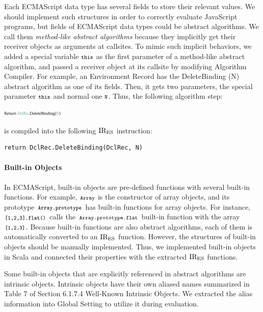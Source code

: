 Each ECMAScript data type has several fields to store their relevant values.
We should implement such structures in order to correctly evaluate JavaScript
programs, but fields of ECMAScript data types could be abstract algorithms.
We call them \textit{method-like abstract algorithms} because they
implicitly get their receiver objects as arguments at callsites.
To mimic such implicit behaviors, we added a special variable
\( \texttt{\footnotesize this} \) as the first parameter of a method-like abstract algorithm,
and passed a receiver object at its callsite by modifying
\textsf{Algorithm Compiler}.  For example, an Environment Record has
the \textsf{DeleteBinding (N)} abstract algorithm as one of its fields.
Then, it gets two parameters, the special parameter \( \texttt{\footnotesize this} \)
and normal one \( \texttt{\footnotesize N} \).  Thus, the following algorithm step:
\begin{center}
  \includegraphics[width=0.22\textwidth]{img/method-like-example.png}
\end{center}
is compiled into the following \( \text{IR}_\text{ES} \) instruction:
\begin{lstlisting}[style=ires]
return DclRec.DeleteBinding(DclRec, N)
\end{lstlisting}

\vspace*{-.5em}
\paragraph{Built-in Objects}
In ECMAScript, built-in objects are pre-defined functions with several
built-in functions.  For example, \( \texttt{\footnotesize Array} \)
is the constructor of array objects, and its prototype
\( \texttt{\footnotesize Array.prototype} \) has built-in functions for array objects.
For instance, \( \texttt{\footnotesize[1,2,3].flat()} \) calls the
\( \texttt{\footnotesize Array.prototype.flat} \) built-in function with the array
\( \texttt{\footnotesize[1,2,3]} \).  Because built-in functions are also abstract
algorithms, each of them is automatically converted to an \( \text{IR}_\text{ES} \)
function.  However, the structures of built-in objects should be
manually implemented.  Thus, we implemented built-in objects in Scala
and connected their properties with the extracted \( \text{IR}_\text{ES} \) functions.

Some built-in objects that are explicitly referenced in abstract
algorithms are intrinsic objects.  Intrinsic objects have their own
aliased names summarized in Table 7 of Section 6.1.7.4
\textsf{Well-Known Intrinsic Objects}.  We extracted the alias
information into \textsf{Global Setting} to utilize it during evaluation.
